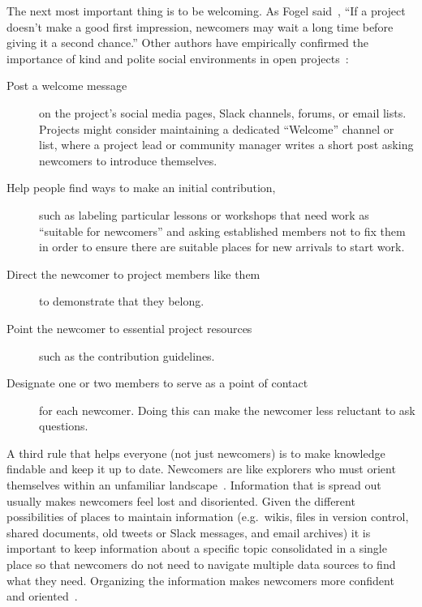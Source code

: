 The next most important thing is to be welcoming.
As Fogel said~\cite{Foge2005},
``If a project doesn't make a good first impression,
newcomers may wait a long time before giving it a second chance.''
Other authors have empirically confirmed the importance of kind and polite social environments
in open projects~\cite{Sing2012,Stei2013,Stei2018}:

\begin{description}

\item[Post a welcome message]
  on the project's social media pages, Slack channels, forums, or email lists.
  Projects might consider maintaining a dedicated ``Welcome'' channel or list,
  where a project lead or community manager writes a short post asking newcomers to introduce themselves.

\item[Help people find ways to make an initial contribution,]
  such as labeling particular lessons or workshops that need work as ``suitable for newcomers''
  and asking established members not to fix them
  in order to ensure there are suitable places for new arrivals to start work.

\item[Direct the newcomer to project members like them]
  to demonstrate that they belong.

\item[Point the newcomer to essential project resources]
  such as the contribution guidelines.

\item[Designate one or two members to serve as a point of contact]
  for each newcomer.
  Doing this can make the newcomer less reluctant to ask questions.

\end{description}

A third rule that helps everyone (not just newcomers)
is to make knowledge findable and keep it up to date.
Newcomers are like explorers who must orient themselves within an unfamiliar landscape~\cite{Dage2010}.
Information that is spread out usually makes newcomers feel lost and disoriented.
Given the different possibilities of places to maintain information
(e.g.\ wikis, files in version control, shared documents, old tweets or Slack messages, and email archives)
it is important to keep information about a specific topic consolidated in a single place
so that newcomers do not need to navigate multiple data sources to find what they need.
Organizing the information makes newcomers more confident and oriented~\cite{Stei2016}.

